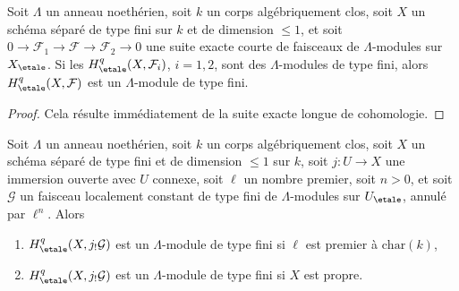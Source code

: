\begin{lemma}
\label{lemma-ses-statements-coefficients}
Soit $\Lambda$ un anneau noethérien, soit $k$ un corps algébriquement clos,
soit $X$ un schéma séparé de type fini sur $k$ et de dimension $\leq 1$, et soit
$0 \to \mathcal{F}_1 \to \mathcal{F} \to \mathcal{F}_2 \to 0$
une suite exacte courte de faisceaux de $\Lambda$-modules sur $X_\etale$. Si
les $H^q_\etale(X, \mathcal{F}_i)$, $i = 1, 2$, sont des $\Lambda$-modules de type fini,
alors $H^q_\etale(X, \mathcal{F})$ est un $\Lambda$-module de type fini.
\end{lemma}

\begin{proof}
Cela résulte immédiatement de la suite exacte longue de cohomologie.
\end{proof}

\begin{lemma}
\label{lemma-vanishing-easier-coefficients}
Soit $\Lambda$ un anneau noethérien, soit $k$ un corps algébriquement clos,
soit $X$ un schéma séparé de type fini et de dimension $\leq 1$ sur $k$,
soit $j : U \to X$ une immersion ouverte avec $U$ connexe, soit
$\ell$ un nombre premier, soit $n > 0$, et soit $\mathcal{G}$ un faisceau
localement constant de type fini de $\Lambda$-modules sur $U_\etale$, annulé par
$\ell^n$. Alors
\begin{enumerate}
\item $H^q_\etale(X, j_!\mathcal{G})$ est un $\Lambda$-module de type fini
si $\ell$ est premier à $\text{char}(k)$,
\item $H^q_\etale(X, j_!\mathcal{G})$ est un $\Lambda$-module de type fini
si $X$ est propre.
\end{enumerate}
\end{lemma}

